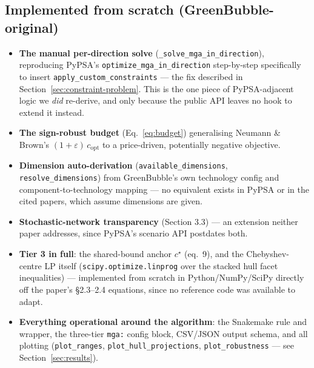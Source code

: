 \documentclass[11pt]{article}
\begin{document}
\subsection{Implemented from scratch (GreenBubble-original)}
\begin{itemize}[leftmargin=1.4em]
  \item \textbf{The manual per-direction solve} (\texttt{\_solve\_mga\_in\_direction}),
    reproducing PyPSA's \texttt{optimize\_mga\_in\_direction} step-by-step
    specifically to insert \texttt{apply\_custom\_constraints} --- the fix
    described in Section~\ref{sec:constraint-problem}. This is the one
    piece of PyPSA-adjacent logic we \emph{did} re-derive, and only because
    the public API leaves no hook to extend it instead.
  \item \textbf{The sign-robust budget} (Eq.~\ref{eq:budget}) generalising
    Neumann \& Brown's $(1+\varepsilon)\,c_{\mathrm{opt}}$ to a
    price-driven, potentially negative objective.
  \item \textbf{Dimension auto-derivation} (\texttt{available\_dimensions},
    \texttt{resolve\_dimensions}) from GreenBubble's own technology config
    and component-to-technology mapping --- no equivalent exists in PyPSA
    or in the cited papers, which assume dimensions are given.
  \item \textbf{Stochastic-network transparency} (Section 3.3) --- an
    extension neither paper addresses, since PyPSA's scenario API postdates
    both.
  \item \textbf{Tier 3 in full}: the shared-bound anchor $c^\star$ (eq.\ 9),
    and the Chebyshev-centre LP itself
    (\texttt{scipy.optimize.linprog} over the stacked hull facet
    inequalities) --- implemented from scratch in Python/NumPy/SciPy
    directly off the paper's \S 2.3--2.4 equations, since no reference code
    was available to adapt.
  \item \textbf{Everything operational around the algorithm}: the
    Snakemake rule and wrapper, the three-tier \texttt{mga:} config block,
    CSV/JSON output schema, and all plotting
    (\texttt{plot\_ranges}, \texttt{plot\_hull\_projections},
    \texttt{plot\_robustness} --- see Section~\ref{sec:results}).
\end{itemize}
\end{document}
